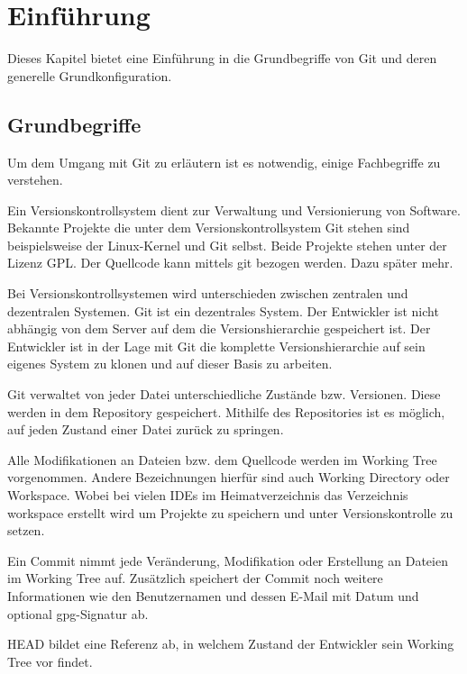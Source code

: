 \section{Einführung}
\label{sec:einfuehrung}
Dieses Kapitel bietet eine Einführung in die Grundbegriffe von Git und deren generelle Grundkonfiguration.

\subsection{Grundbegriffe}
\label{sec:einfuehrung.grundbegriffe}
Um dem Umgang mit Git zu erläutern ist es notwendig, einige Fachbegriffe zu verstehen. 

Ein Versionskontrollsystem dient zur Verwaltung und Versionierung von Software. Bekannte Projekte die unter dem Versionskontrollsystem Git stehen sind beispielsweise der Linux-Kernel und Git selbst. Beide Projekte stehen unter der Lizenz GPL. Der Quellcode kann mittels git bezogen werden. Dazu später mehr.

Bei Versionskontrollsystemen wird unterschieden zwischen zentralen und dezentralen Systemen. Git ist ein dezentrales System. Der Entwickler ist nicht abhängig von dem Server auf dem die Versionshierarchie gespeichert ist. Der Entwickler ist in der Lage mit Git die komplette Versionshierarchie auf sein eigenes System zu klonen und auf dieser Basis zu arbeiten.   

Git  verwaltet von jeder Datei unterschiedliche Zustände bzw. Versionen. Diese werden in dem Repository gespeichert. Mithilfe des Repositories ist es möglich, auf jeden Zustand einer Datei zurück zu springen.

Alle Modifikationen an Dateien bzw. dem Quellcode werden im Working Tree vorgenommen. Andere Bezeichnungen hierfür sind auch Working Directory oder Workspace. Wobei bei vielen IDEs im Heimatverzeichnis das Verzeichnis workspace erstellt wird um Projekte zu speichern und unter Versionskontrolle zu setzen. 

Ein Commit nimmt jede Veränderung, Modifikation oder Erstellung an Dateien im Working Tree auf. Zusätzlich speichert der Commit noch weitere Informationen wie den Benutzernamen und dessen E-Mail mit Datum und optional gpg-Signatur ab.  

HEAD bildet eine Referenz ab, in welchem Zustand der Entwickler sein Working Tree vor findet. 


